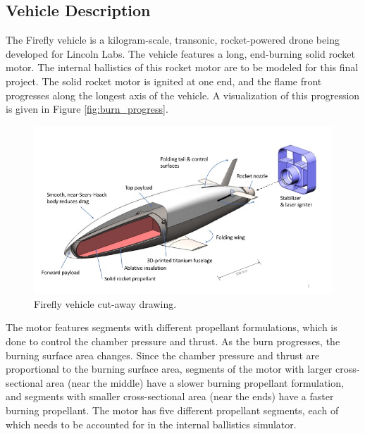 \documentclass[12pt, letterpaper]{article}
\begin{document}
\subsection{Vehicle Description}

The Firefly vehicle is a kilogram-scale, transonic, rocket-powered drone being developed for Lincoln Labs. The vehicle features a long, end-burning solid rocket motor. The internal ballistics of this rocket motor are to be modeled for this final project. The solid rocket motor is ignited at one end, and the flame front progresses along the longest axis of the vehicle. A visualization of this progression is given in Figure \ref{fig:burn_progress}. 

\begin{figure}
    \centering
    \includegraphics[width=1\textwidth]{vehicle}
    \caption{\label{fig:vehicle} Firefly vehicle cut-away drawing.}
\end{figure}

The motor features segments with different propellant formulations, which is done to control the chamber pressure and thrust. As the burn progresses, the burning surface area changes. Since the chamber pressure and thrust are proportional to the burning surface area, segments of the motor with larger cross-sectional area (near the middle) have a slower burning propellant formulation, and segments with smaller cross-sectional area (near the ends) have a faster burning propellant. The motor has five different propellant segments, each of which needs to be accounted for in the internal ballistics simulator. 
\end{document}
